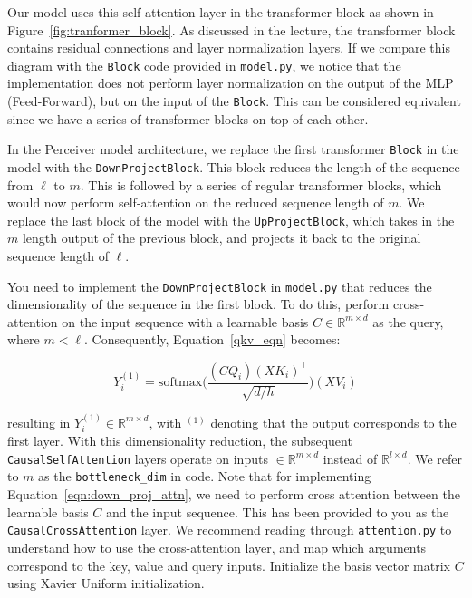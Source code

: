 \begin{parts}
Our model uses this self-attention layer in the transformer block as shown in Figure~\ref{fig:tranformer_block}. As discussed in the lecture, the transformer block contains residual connections and layer normalization layers. If we compare this diagram with the \texttt{Block} code provided in \texttt{model.py}, we notice that the implementation does not perform layer normalization on the output of the MLP (Feed-Forward), but on the input of the \texttt{Block}. This can be considered equivalent since we have a series of transformer blocks on top of each other. 

In the Perceiver model architecture, we replace the first transformer \texttt{Block} in the model with the \texttt{DownProjectBlock}. This block reduces the length of the sequence from $\ell$ to $m$. This is followed by a series of regular transformer blocks, which would now perform self-attention on the reduced sequence length of $m$. We replace the last block of the model with the \texttt{UpProjectBlock}, which takes in the $m$ length output of the previous block, and projects it back to the original sequence length of $\ell$.

You need to implement the \texttt{DownProjectBlock} in \texttt{model.py} that reduces the dimensionality of the sequence in the first block. To do this, perform cross-attention on the input sequence with a learnable basis $C \in \mathbb{R}^{m \times d}$ as the query, where $m < \ell$. Consequently, Equation~\ref{qkv_eqn} becomes: 

\begin{equation}\label{eqn:down_proj_attn}
Y_i^{(1)} = \text{softmax}\bigg(\frac{(CQ_i)(XK_i)^\top}{\sqrt{d/h}}\bigg)(XV_i)    
\end{equation}

resulting in $Y_i^{(1)} \in\mathbb{R}^{m\times d}$, with $^{(1)}$ denoting that the output corresponds to the first layer. With this dimensionality reduction, the subsequent \texttt{CausalSelfAttention} layers operate on inputs $\in \mathbb{R}^{m\times d}$ instead of $\mathbb{R}^{l\times d}$. We refer to $m$ as the \texttt{bottleneck\_dim} in code. Note that for implementing Equation~\ref{eqn:down_proj_attn}, we need to perform cross attention between the learnable basis $C$ and the input sequence. This has been provided to you as the \texttt{CausalCrossAttention} layer. We recommend reading through \texttt{attention.py} to understand how to use the cross-attention layer, and map which arguments correspond to the key, value and query inputs. Initialize the basis vector matrix $C$ using Xavier Uniform initialization.


\end{parts}
